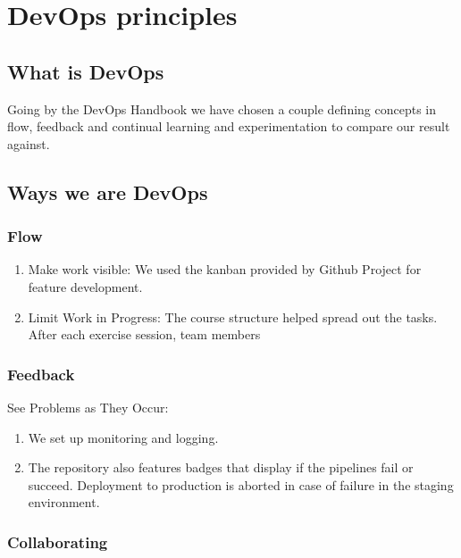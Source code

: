 \documentclass{article}
\begin{document}
\section{DevOps principles}\label{DevOpsPrinciplesSection}

\subsection{What is DevOps}

Going by the DevOps Handbook \cite{devopshandbook} we have chosen a couple defining concepts in flow, feedback and continual learning and experimentation to compare our result against. 

\subsection{Ways we are DevOps}

\subsubsection{Flow}

\begin{enumerate}
    \item Make work visible: We used the kanban provided by Github Project for feature development. 
    \item Limit Work in Progress: The course structure helped spread out the tasks. After each exercise session, team members 
\end{enumerate}

\subsubsection{Feedback}

See Problems as They Occur: 

\begin{enumerate}
    \item We set up monitoring and logging.
    \item The repository also features badges that display if the pipelines fail or succeed. Deployment to production is aborted in case of failure in the staging environment.
\end{enumerate}

\subsubsection{Collaborating}
\end{document}
